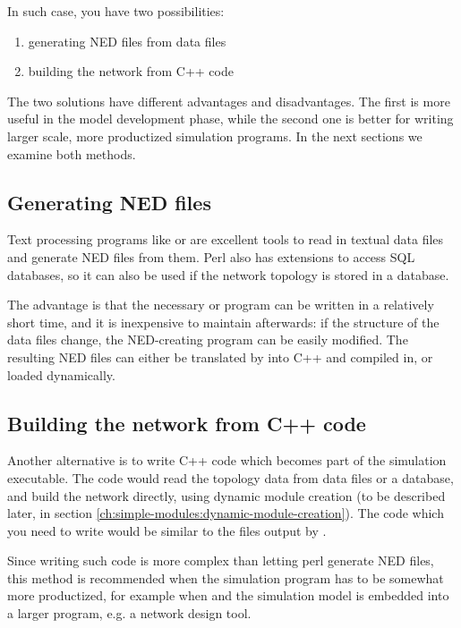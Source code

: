 In such case, you have two possibilities:

\begin{enumerate}
  \item{generating NED files from data files}
  \item{building the network from C++ code}
\end{enumerate}

The two solutions have different advantages and disadvantages.
The first is more useful in the model development phase, while
the second one is better for writing larger scale, more productized
simulation programs. In the next sections we examine both methods.



\subsection{Generating NED files}


Text processing programs like  or  are
excellent tools to read in textual data files and generate NED files
from them.  Perl also has extensions to
access SQL databases, so it can also be used if the network topology
is stored in a database.

The advantage is that the necessary  or 
program can be written in a relatively short time, and it is
inexpensive to maintain afterwards: if the structure of the data files
change, the NED-creating program can be easily modified. The
resulting NED files can either be translated by 
into C++ and compiled in, or loaded dynamically.


\subsection{Building the network from C++ code}

Another alternative is to write C++ code which becomes part of the
simulation executable. The code would read the topology data from data
files or a database, and build the network directly, using
dynamic module creation (to be described later, in section
\ref{ch:simple-modules:dynamic-module-creation}).
The code which you need to write would be similar to the 
files output by .

Since writing such code is more complex than letting perl generate
NED files, this method is recommended when the simulation program
has to be somewhat more productized, for example when {\opp}
and the simulation model is embedded into a larger program, e.g.
a network design tool.


